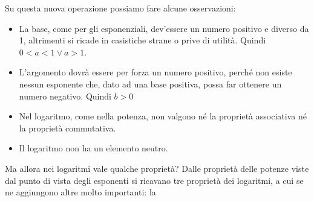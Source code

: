 Su questa nuova operazione possiamo fare alcune osservazioni:

\begin{itemize}
 \item La base, come per gli esponenziali, dev'essere un numero positivo e 
diverso da 1, altrimenti si ricade in casistiche strane o prive di utilità.
Quindi \(0<a<1 \lor a>1\).
 \item L'argomento dovrà essere per forza un numero positivo, perché non 
esiste 
nessun esponente che, dato ad una base positiva, possa far ottenere un 
numero 
negativo. Quindi \(b>0\)
 \item Nel logaritmo, come nella potenza, non valgono né la proprietà 
associativa né la proprietà commutativa.
 \item Il logaritmo non ha un elemento neutro.
\end{itemize}

\noindent Ma allora nei logaritmi vale qualche proprietà? 
Dalle proprietà delle potenze viste dal punto di vista degli 
esponenti si ricavano tre proprietà dei logaritmi, a cui se ne aggiungono 
altre molto importanti:
% 
la 

